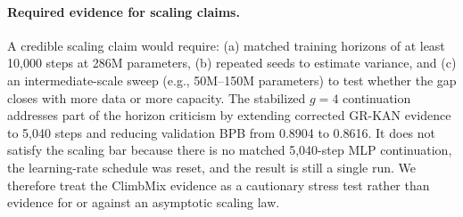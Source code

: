 \documentclass{article}
\newcommand{\modelname}[1]{\textsc{#1}}
\newcommand{\grkan}{\modelname{GR-KAN}}
\begin{document}
\paragraph{Required evidence for scaling claims.}
A credible scaling claim would require: (a) matched training horizons of at least 10,000 steps at 286M parameters, (b) repeated seeds to estimate variance, and (c) an intermediate-scale sweep (e.g., 50M--150M parameters) to test whether the gap closes with more data or more capacity. The stabilized \(g=4\) continuation addresses part of the horizon criticism by extending corrected \grkan{} evidence to 5,040 steps and reducing validation BPB from 0.8904 to 0.8616. It does not satisfy the scaling bar because there is no matched 5,040-step MLP continuation, the learning-rate schedule was reset, and the result is still a single run. We therefore treat the ClimbMix evidence as a cautionary stress test rather than evidence for or against an asymptotic scaling law.
\end{document}
